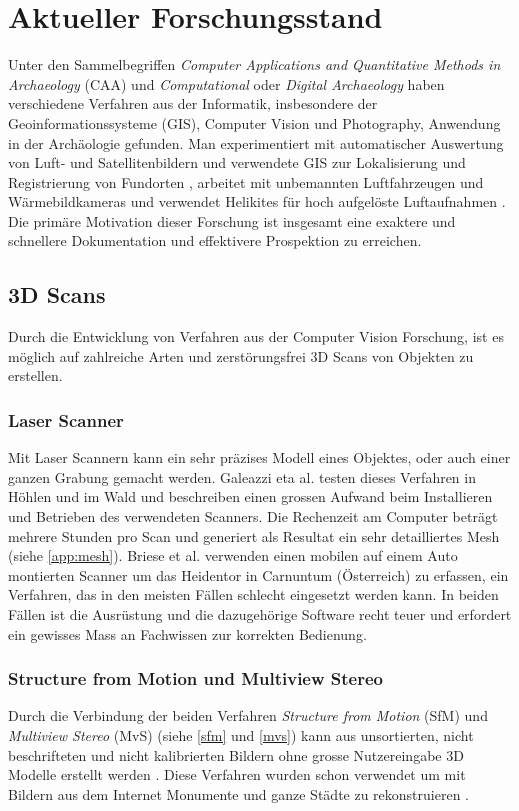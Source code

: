 \chapter{Aktueller Forschungsstand}

	Unter den Sammelbegriffen \emph{Computer Applications and Quantitative Methods in Archaeology} (CAA) und \emph{Computational} oder \emph{Digital Archaeology} haben verschiedene Verfahren aus der Informatik, insbesondere der Geoinformationssysteme (GIS), Computer Vision und Photography, Anwendung in der Archäologie gefunden.
	Man experimentiert mit automatischer Auswertung von Luft- und Satellitenbildern und verwendete GIS zur Lokalisierung und Registrierung von Fundorten \cite{comp_app_arch}, arbeitet mit unbemannten Luftfahrzeugen und Wärmebildkameras \cite{Casana2014207} und verwendet Helikites für hoch aufgelöste Luftaufnahmen \cite{ARCM:ARCM667}.
	Die primäre Motivation dieser Forschung ist insgesamt eine exaktere und schnellere Dokumentation und effektivere Prospektion zu erreichen.

	\section{3D Scans}
		Durch die Entwicklung von Verfahren aus der Computer Vision Forschung, ist es möglich auf zahlreiche Arten und zerstörungsfrei 3D Scans von Objekten zu erstellen.
		\subsection{Laser Scanner}
			Mit Laser Scannern kann ein sehr präzises Modell eines Objektes, oder auch einer ganzen Grabung gemacht werden. Galeazzi eta al. \cite{arch:laser_vs_dense_stereo} testen dieses Verfahren in Höhlen und im Wald und beschreiben einen grossen Aufwand beim Installieren und Betrieben des verwendeten Scanners. Die Rechenzeit am Computer beträgt mehrere Stunden pro Scan und generiert als Resultat ein sehr detailliertes Mesh (siehe \autoref{app:mesh}).
			Briese et al. \cite{TUW-210216} verwenden einen mobilen auf einem Auto montierten Scanner um das Heidentor in Carnuntum (Österreich) zu erfassen, ein Verfahren, das in den meisten Fällen schlecht eingesetzt werden kann.
			In beiden Fällen ist die Ausrüstung und die dazugehörige Software recht teuer und erfordert ein gewisses Mass an Fachwissen zur korrekten Bedienung.

		\subsection{Structure from Motion und Multiview Stereo}
			Durch die Verbindung der beiden Verfahren \emph{Structure from Motion} (SfM) und \emph{Multiview Stereo} (MvS) (siehe \autoref{sfm} und \autoref{mvs}) kann aus unsortierten, nicht beschrifteten und nicht kalibrierten Bildern ohne grosse Nutzereingabe 3D Modelle erstellt werden \cite{Szeliski:2010:CVA:1941882, Agarwal:2011:BRD:2001269.2001293, Furu:2010:PMVS}. Diese Verfahren wurden schon verwendet um mit Bildern aus dem Internet Monumente und ganze Städte zu rekonstruieren \cite{Agarwal:2011:BRD:2001269.2001293, Furu:2010, Frahm_buildingrome, Snavely:2006:PTE:1179352.1141964}.
			
